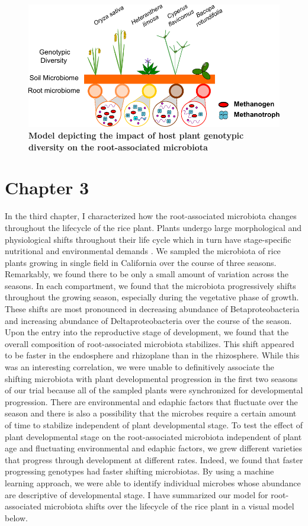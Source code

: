 \begin{figure}[h]
\centering
\includegraphics[width=6in]{Figures/figurec_2}
\caption[Figure 5.2]{\textbf{Model depicting the impact of host plant genotypic diversity on the root-associated microbiota}}
\label{Figure 5.2}
\end{figure}

\section{Chapter 3}
In the third chapter, I characterized how the root-associated microbiota changes throughout the lifecycle of the rice plant. Plants undergo large morphological and physiological shifts throughout their life cycle which in turn have stage-specific nutritional and environmental demands \cite{Ishimaru2013}. We sampled the microbiota of rice plants growing in single field in California over the course of three seasons. Remarkably, we found there to be only a small amount of variation across the seasons. In each compartment, we found that the microbiota progressively shifts throughout the growing season, especially during the vegetative phase of growth. These shifts are most pronounced in decreasing abundance of Betaproteobacteria and increasing abundance of Deltaproteobacteria over the course of the season. Upon the entry into the reproductive stage of development, we found that the overall composition of root-associated microbiota stabilizes. This shift appeared to be faster in the endosphere and rhizoplane than in the rhizosphere. While this was an interesting correlation, we were unable to definitively associate the shifting microbiota with plant developmental progression in the first two seasons of our trial because all of the sampled plants were synchronized for developmental progression. There are environmental and edaphic factors that fluctuate over the season and there is also a possibility that the microbes require a certain amount of time to stabilize independent of plant developmental stage. To test the effect of plant developmental stage on the root-associated microbiota independent of plant age and fluctuating environmental and edaphic factors, we grew different varieties that progress through development at different rates. Indeed, we found that faster progressing genotypes had faster shifting microbiotas. By using a machine learning approach, we were able to identify individual microbes whose abundance are descriptive of developmental stage. I have summarized our model for root-associated microbiota shifts over the lifecycle of the rice plant in a visual model below.

